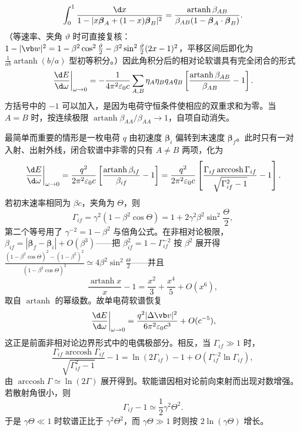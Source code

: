 \begin{equation*}
	\int_0^1\frac{\d x}{1-|x\boldsymbol\beta_A+(1-x)\boldsymbol\beta_B|^2}
	=\frac{\operatorname{artanh}\beta_{AB}}
	{\beta_{AB}(1-\boldsymbol\beta_A\cdot\boldsymbol\beta_B)}.
\end{equation*}
（等速率、夹角 $\vartheta$ 时可直接复核：$1-|\vb w|^2=1-\beta^2\cos^2\frac{\vartheta}{2}-\beta^2\sin^2\frac{\vartheta}{2}(2x-1)^2$，平移区间后即化为 $\frac{1}{ab}\operatorname{artanh}(b/a)$ 型初等积分。）因此角积分后的相对论软谱具有完全闭合的形式
\begin{equation*}
	\left.\frac{\d E}{\d\omega}\right|_{\omega\to0}
	=-\frac{1}{4\pi^2\varepsilon_0c}
	\sum_{A,B}\eta_A\eta_Bq_Aq_B
	\left[
	\frac{\operatorname{artanh}\beta_{AB}}{\beta_{AB}}-1
	\right].
\end{equation*}
方括号中的 $-1$ 可以加入，是因为电荷守恒条件使相应的双重求和为零。当 $A=B$ 时，按连续极限 $\operatorname{artanh}\beta_{AA}/\beta_{AA}\to1$，自项自动消失。

最简单而重要的情形是一枚电荷 $q$ 由初速度 $\boldsymbol\beta_i$ 偏转到末速度 $\boldsymbol\beta_f$。此时只有一对入射、出射外线，闭合软谱中非零的只有 $A\neq B$ 两项，化为
\begin{equation*}
	\left.\frac{\d E}{\d\omega}\right|_{\omega\to0}
	=\frac{q^2}{2\pi^2\varepsilon_0c}
	\left[
	\frac{\operatorname{artanh}\beta_{if}}{\beta_{if}}-1
	\right]
	=\frac{q^2}{2\pi^2\varepsilon_0c}
	\left[
	\frac{\Gamma_{if}\operatorname{arccosh}\Gamma_{if}}
	{\sqrt{\Gamma_{if}^2-1}}-1
	\right].
\end{equation*}
若初末速率相同为 $\beta c$，夹角为 $\Theta$，则
\begin{equation*}
	\Gamma_{if}
	=\gamma^2(1-\beta^2\cos\Theta)
	=1+2\gamma^2\beta^2\sin^2\frac{\Theta}{2},
\end{equation*}
第二个等号用了 $\gamma^{-2}=1-\beta^2$ 与倍角公式。在非相对论极限，$\beta_{if}=|\boldsymbol\beta_f-\boldsymbol\beta_i|+O(\beta^3)$——把 $\beta_{if}^2=1-\Gamma_{if}^{-2}$ 按 $\beta^2$ 展开得 $\frac{(1-\beta^2\cos\Theta)^2-(1-\beta^2)^2}{(1-\beta^2\cos\Theta)^2}\simeq4\beta^2\sin^2\frac{\Theta}{2}$——并且
\begin{equation*}
	\frac{\operatorname{artanh}x}{x}-1
	=\frac{x^2}{3}+\frac{x^4}{5}+O(x^6),
\end{equation*}
取自 $\operatorname{artanh}$ 的幂级数。故单电荷软谱恢复
\begin{equation*}
	\left.\frac{\d E}{\d\omega}\right|_{\omega\to0}
	=\frac{q^2|\Delta\vb v|^2}{6\pi^2\varepsilon_0c^3}
	+O(c^{-5}),
\end{equation*}
这正是前面非相对论边界形式中的电偶极部分。相反，当 $\Gamma_{if}\gg1$ 时，
\begin{equation*}
	\frac{\Gamma_{if}\operatorname{arccosh}\Gamma_{if}}
	{\sqrt{\Gamma_{if}^2-1}}-1
	=\ln(2\Gamma_{if})-1+O(\Gamma_{if}^{-2}\ln\Gamma_{if}),
\end{equation*}
由 $\operatorname{arccosh}\Gamma\simeq\ln(2\Gamma)$ 展开得到。软能谱因相对论前向束射而出现对数增强。若散射角很小，则
\begin{equation*}
	\Gamma_{if}-1\simeq\frac{1}{2}\gamma^2\Theta^2.
\end{equation*}
于是 $\gamma\Theta\ll1$ 时软谱正比于 $\gamma^2\Theta^2$，而 $\gamma\Theta\gg1$ 时则按 $2\ln(\gamma\Theta)$ 增长。

